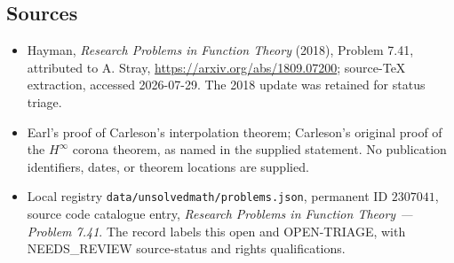 \documentclass[11pt]{article}
\begin{document}
\subsection{Sources}
\begin{itemize}
\item Hayman, \emph{Research Problems in Function Theory} (2018), Problem 7.41, attributed to A. Stray, \url{https://arxiv.org/abs/1809.07200}; source-TeX extraction, accessed 2026-07-29. The 2018 update was retained for status triage.
\item Earl's proof of Carleson's interpolation theorem; Carleson's original proof of the $H^\infty$ corona theorem, as named in the supplied statement. No publication identifiers, dates, or theorem locations are supplied.
\item Local registry \texttt{data/unsolvedmath/problems.json}, permanent ID $2307041$, source code catalogue entry, \emph{Research Problems in Function Theory --- Problem 7.41}. The record labels this open and OPEN-TRIAGE, with NEEDS\_REVIEW source-status and rights qualifications.
\end{itemize}
\end{document}

